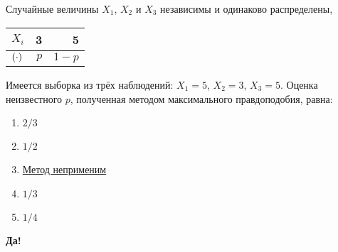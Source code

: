 \documentclass[t]{beamer}
\let\P\relax
\DeclareMathOperator{\P}{\mathbb{P}}
\begin{document}
 \begin{frame} \label{32-Yes} 
\begin{block}{32} 

  Случайные величины $X_1$, $X_2$ и $X_3$ независимы и одинаково распределены,

\begin{center}
  \begin{tabular}{lrr} \toprule
  $X_i$ & 3 & 5 \\
  \midrule
  $\P(\cdot)$ & $p$ & $1-p$ \\
  \bottomrule
  \end{tabular}
\end{center}

  Имеется выборка из трёх наблюдений: $X_1=5$, $X_2=3$, $X_3=5$. Оценка неизвестного $p$, полученная методом максимального правдоподобия, равна:


  


 \end{block} 
\begin{enumerate} 
\item[] \hyperlink{32-No}{\beamergotobutton{} $2/3$}
\item[] \hyperlink{32-No}{\beamergotobutton{} $1/2$}
\item[] \hyperlink{32-No}{\beamergotobutton{} Метод неприменим}
\item[] \hyperlink{32-Yes}{\beamergotobutton{} $1/3$}
\item[] \hyperlink{32-No}{\beamergotobutton{} $1/4$}
\end{enumerate} 

 \textbf{Да!} 
 \hyperlink{33}{}\end{frame} 
\end{document}
